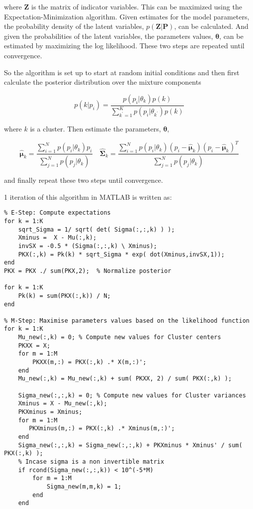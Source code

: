 \documentclass{article}
\begin{document}
where \textbf{Z} is the matrix of indicator variables. This can be maximized using the Expectation-Minimization algorithm. Given estimates for the model parameters, the probability density of the latent variables, $p(\textbf{Z} | \textbf{P})$, can be calculated. And given the probabilities of the latent variables, the parameters values, $\boldsymbol{\theta}$, can be estimated by maximizing the log likelihood. These two steps are repeated until convergence.

So the algorithm is set up to start at random initial conditions and then first calculate the posterior distribution over the mixture components

\begin{equation}
	p(k|p_i) = \frac{ p(p_i | \theta_k)p(k) }{ \sum_{k^\prime = 1}^K p(p_i | \theta_{k^\prime})p(k)  }
\end{equation}

where $k$ is a cluster. Then estimate the parameters, $\boldsymbol{\theta}$, 

\begin{equation}
	\hat{\boldsymbol{\mu}}_k = \frac{ \sum_{i=1}^N p(p_i | \theta_k) p_i}{ \sum_{j=1}^N p(p_j | \theta_k)} \quad \hat{\boldsymbol{\Sigma}}_k = \frac{ \sum_{i=1}^N p(p_i | \theta_k) (p_i - \hat{\boldsymbol{\mu}}_k)(p_i - \hat{\boldsymbol{\mu}}_k)^T}{\sum_{j=1}^N p(p_j | \theta_k)}
\end{equation}

and finally repeat these two steps until convergence.

1 iteration of this algorithm in MATLAB is written as:

\begin{lstlisting}
% E-Step: Compute expectations
for k = 1:K
    sqrt_Sigma = 1/ sqrt( det( Sigma(:,:,k) ) );
    Xminus =  X - Mu(:,k);
    invSX = -0.5 * (Sigma(:,:,k) \ Xminus);
    PKX(:,k) = Pk(k) * sqrt_Sigma * exp( dot(Xminus,invSX,1));
end
PKX = PKX ./ sum(PKX,2);  % Normalize posterior

for k = 1:K
    Pk(k) = sum(PKX(:,k)) / N;
end

% M-Step: Maximise parameters values based on the likelihood function
for k = 1:K
    Mu_new(:,k) = 0; % Compute new values for Cluster centers
    PKXX = X;
    for m = 1:M
        PKXX(m,:) = PKX(:,k) .* X(m,:)';
    end
    Mu_new(:,k) = Mu_new(:,k) + sum( PKXX, 2) / sum( PKX(:,k) );
    
    Sigma_new(:,:,k) = 0; % Compute new values for Cluster variances
    Xminus = X - Mu_new(:,k);
    PKXminus = Xminus;
    for m = 1:M
       PKXminus(m,:) = PKX(:,k) .* Xminus(m,:)';
    end
    Sigma_new(:,:,k) = Sigma_new(:,:,k) + PKXminus * Xminus' / sum( PKX(:,k) );
    % Incase sigma is a non invertible matrix
    if rcond(Sigma_new(:,:,k)) < 10^(-5*M)
        for m = 1:M
            Sigma_new(m,m,k) = 1;
        end
    end
\end{lstlisting}
\end{document}
